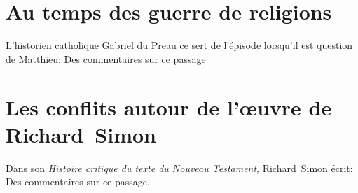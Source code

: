 \documentclass[a4]{article}
\begin{document}
\section{Au temps des guerre de religions}
L'historien catholique Gabriel du Preau ce sert de l'épisode lorsqu'il est question de Matthieu:
Des commentaires sur ce passage

\section{Les conflits autour de l'œuvre de Richard~Simon}
Dans son \emph{Histoire critique du texte du Nouveau Testament}, Richard~Simon écrit:
Des commentaires sur ce passage.
\end{document}
